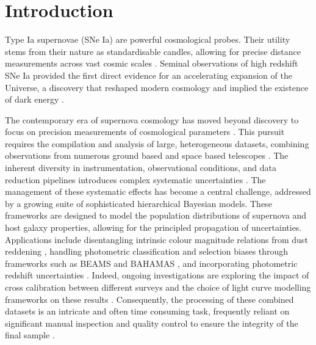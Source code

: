 \section{Introduction}

Type Ia supernovae (SNe Ia) are powerful cosmological probes. Their utility stems from their nature as standardisable candles, allowing for precise distance measurements across vast cosmic scales \citep{Huang2019, Jha2019}. Seminal observations of high redshift SNe Ia provided the first direct evidence for an accelerating expansion of the Universe, a discovery that reshaped modern cosmology and implied the existence of dark energy \citep{Riess1998, Perlmutter1999}.

The contemporary era of supernova cosmology has moved beyond discovery to focus on precision measurements of cosmological parameters \citep{Gall2024, Risaliti2018, Liang2008}. This pursuit requires the compilation and analysis of large, heterogeneous datasets, combining observations from numerous ground based and space based telescopes \citep[e.g.,][]{Scolnic2022}. The inherent diversity in instrumentation, observational conditions, and data reduction pipelines introduces complex systematic uncertainties \citep{Goobar2008, Menard2009, Mandel2016}. The management of these systematic effects has become a central challenge, addressed by a growing suite of sophisticated hierarchical Bayesian models. These frameworks are designed to model the population distributions of supernova and host galaxy properties, allowing for the principled propagation of uncertainties. Applications include disentangling intrinsic colour magnitude relations from dust reddening \citep{Mandel2011, Mandel2014, Mandel2016_dust, Mandel2017}, handling photometric classification and selection biases through frameworks such as BEAMS and BAHAMAS \citep{Hlozek2012, Shariff2015}, and incorporating photometric redshift uncertainties \citep{Roberts2017}. Indeed, ongoing investigations are exploring the impact of cross calibration between different surveys and the choice of light curve modelling frameworks on these results \citep{arXiv:2506.05471, arXiv:2410.13747}. Consequently, the processing of these combined datasets is an intricate and often time consuming task, frequently reliant on significant manual inspection and quality control to ensure the integrity of the final sample \citep{Chotard2011, Hauret2018, Gonzalez2020}.

